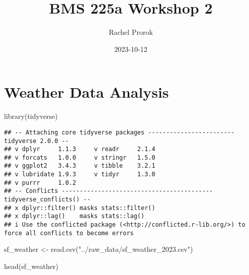 \documentclass[
]{article}
\title{BMS 225a Workshop 2}
\author{Rachel Prorok}
\date{2023-10-12}
\newenvironment{Shaded}{\begin{snugshade}}{\end{snugshade}}
\newcommand{\FunctionTok}[1]{\textcolor[rgb]{0.00,0.00,0.00}{#1}}
\newcommand{\NormalTok}[1]{#1}
\newcommand{\OtherTok}[1]{\textcolor[rgb]{0.56,0.35,0.01}{#1}}
\newcommand{\StringTok}[1]{\textcolor[rgb]{0.31,0.60,0.02}{#1}}
\begin{document}
\maketitle

\hypertarget{weather-data-analysis}{%
\section{Weather Data Analysis}\label{weather-data-analysis}}

\begin{Shaded}
\begin{Highlighting}[]
\FunctionTok{library}\NormalTok{(tidyverse)}
\end{Highlighting}
\end{Shaded}

\begin{verbatim}
## -- Attaching core tidyverse packages ------------------------ tidyverse 2.0.0 --
## v dplyr     1.1.3     v readr     2.1.4
## v forcats   1.0.0     v stringr   1.5.0
## v ggplot2   3.4.3     v tibble    3.2.1
## v lubridate 1.9.3     v tidyr     1.3.0
## v purrr     1.0.2     
## -- Conflicts ------------------------------------------ tidyverse_conflicts() --
## x dplyr::filter() masks stats::filter()
## x dplyr::lag()    masks stats::lag()
## i Use the conflicted package (<http://conflicted.r-lib.org/>) to force all conflicts to become errors
\end{verbatim}

\begin{Shaded}
\begin{Highlighting}[]
\NormalTok{sf\_weather }\OtherTok{\textless{}{-}} \FunctionTok{read.csv}\NormalTok{(}\StringTok{"../raw\_data/sf\_weather\_2023.csv"}\NormalTok{)}

\FunctionTok{head}\NormalTok{(sf\_weather)}
\end{Highlighting}
\end{Shaded}
\end{document}
